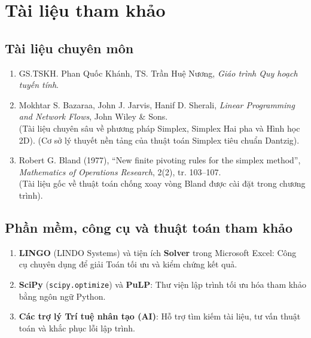 \documentclass[14pt, a4paper]{extarticle}
\begin{document}
    \section{Tài liệu tham khảo}
    
    \subsection{Tài liệu chuyên môn}
    \begin{enumerate}
        \item GS.TSKH. Phan Quốc Khánh, TS. Trần Huệ Nương, \textit{Giáo trình Quy hoạch tuyến tính}.
        \item Mokhtar S. Bazaraa, John J. Jarvis, Hanif D. Sherali, \textit{Linear Programming and Network Flows}, John Wiley \& Sons. \\
        (Tài liệu chuyên sâu về phương pháp Simplex, Simplex Hai pha và Hình học 2D).
        (Cơ sở lý thuyết nền tảng của thuật toán Simplex tiêu chuẩn Dantzig).
        \item Robert G. Bland (1977), ``New finite pivoting rules for the simplex method'', \textit{Mathematics of Operations Research}, 2(2), tr. 103--107. \\
        (Tài liệu gốc về thuật toán chống xoay vòng Bland được cài đặt trong chương trình).
    \end{enumerate}

    \subsection{Phần mềm, công cụ và thuật toán tham khảo}
    \begin{enumerate}
        \item \textbf{LINGO} (LINDO Systems) và tiện ích \textbf{Solver} trong Microsoft Excel: Công cụ chuyên dụng để giải Toán tối ưu và kiểm chứng kết quả.
        \item \textbf{SciPy} (\texttt{scipy.optimize}) và \textbf{PuLP}: Thư viện lập trình tối ưu hóa tham khảo bằng ngôn ngữ Python.
        \item \textbf{Các trợ lý Trí tuệ nhân tạo (AI)}: Hỗ trợ tìm kiếm tài liệu, tư vấn thuật toán và khắc phục lỗi lập trình.
    \end{enumerate}
    
    
\end{document}
